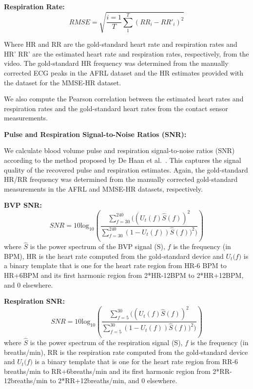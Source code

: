 \documentclass{article}
\begin{document}
\textbf{Respiration Rate:}
\begin{equation}
RMSE = \sqrt{\frac{i=1}{T}\sum_{1}^{T} (RR_{i} - RR'_{i})^{2}}
\end{equation}

Where HR and RR are the gold-standard heart rate and respiration rates and HR' RR' are the estimated heart rate and respiration rates, respectively, from the video. The gold-standard HR frequency was determined from the manually corrected ECG peaks in the AFRL dataset and the HR estimates provided with the dataset for the MMSE-HR dataset.

We also compute the Pearson correlation between the estimated heart rates and respiration rates and the gold-standard heart rates from the contact sensor measurements.

\textbf{Pulse and Respiration Signal-to-Noise Ratios (SNR):} 

We calculate blood volume pulse and respiration signal-to-noise ratios (SNR) according to the method proposed by De Haan et al.~\citep{de2013robust}. This captures the signal quality of the recovered pulse and respiration estimates. Again, the gold-standard HR/RR frequency was determined from the manually corrected gold-standard measurements in the AFRL and MMSE-HR datasets, respectively.

\textbf{BVP SNR:}
\begin{equation}
SNR = 10\mathrm{log}_{10}\left(\frac{\sum^{240}_{f=30}((U_t(f)\hat{S}(f))^2}{\sum^{240}_{f=30}(1 - U_t(f))\hat{S}(f))^2)}\right)
\end{equation}
where $\hat{S}$ is the power spectrum of the BVP signal (S), $\textit{f}$ is the frequency (in BPM), HR is the heart rate computed from the gold-standard device  and $\textit{U$_{t}$(f)}$ is a binary template that is one for the heart rate region from HR-6 BPM to HR+6BPM and its first harmonic region from 2*HR-12BPM to 2*HR+12BPM, and 0 elsewhere. 

\textbf{Respiration SNR:}
\begin{equation}
SNR = 10\mathrm{log}_{10}\left(\frac{\sum^{30}_{f=5}((U_t(f)\hat{S}(f))^2}{\sum^{30}_{f=5}(1 - U_t(f))\hat{S}(f))^2)}\right)
\end{equation}
where $\hat{S}$ is the power spectrum of the respiration signal (S), $\textit{f}$ is the frequency (in breaths/min), RR is the respiration rate computed from the gold-standard device and $\textit{U$_{t}$(f)}$ is a binary template that is one for the heart rate region from RR-6 breaths/min to RR+6breaths/min and its first harmonic region from 2*RR-12breaths/min to 2*RR+12breaths/min, and 0 elsewhere.   
\end{document}
